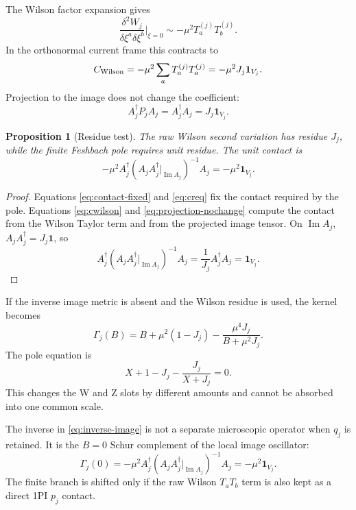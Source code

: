 \documentclass[11pt]{article}
\newcommand{\Imop}{\operatorname{Im}}
\theoremstyle{plain}
\newtheorem{proposition}{Proposition}[section]
\theoremstyle{definition}
\begin{document}
The Wilson factor expansion gives
\begin{equation}
  \frac{\delta^2W_j}{\delta\xi^a\delta\xi^b}\bigg|_{\xi=0}
  \sim -\mu^2T_a^{(j)}T_b^{(j)}.
  \label{eq:wilson2}
\end{equation}
In the orthonormal current frame this contracts to
\begin{equation}
  C_{\rm Wilson}
  =
  -\mu^2\sum_aT_a^{(j)}T_a^{(j)}
  =
  -\mu^2J_j\mathbf 1_{V_j}.
  \label{eq:cwilson}
\end{equation}
Projection to the image does not change the coefficient:
\begin{equation}
  A_j^\dagger P_jA_j
  =
  A_j^\dagger A_j
  =
  J_j\mathbf 1_{V_j}.
  \label{eq:projection-nochange}
\end{equation}

\begin{proposition}[Residue test]
The raw Wilson second variation has residue \(J_j\), while the finite
Feshbach pole requires unit residue.  The unit contact is
\begin{equation}
  -\mu^2A_j^\dagger
  \left(A_jA_j^\dagger|_{\Imop A_j}\right)^{-1}
  A_j
  =
  -\mu^2\mathbf 1_{V_j}.
  \label{eq:inverse-image}
\end{equation}
\end{proposition}

\begin{proof}
Equations \eqref{eq:contact-fixed} and \eqref{eq:creq} fix the contact required
by the pole.  Equations \eqref{eq:cwilson} and \eqref{eq:projection-nochange}
compute the contact from the Wilson Taylor term and from the projected image
tensor.  On \(\Imop A_j\),
\(A_jA_j^\dagger=J_j\mathbf 1\), so
\[
  A_j^\dagger
  \left(A_jA_j^\dagger|_{\Imop A_j}\right)^{-1}
  A_j
  =
  \frac{1}{J_j}A_j^\dagger A_j
  =
  \mathbf 1_{V_j}.
\]
\end{proof}

If the inverse image metric is absent and the Wilson residue is used, the
kernel becomes
\begin{equation}
  \Gamma_j(B)
  =
  B+\mu^2(1-J_j)
  -\frac{\mu^4J_j}{B+\mu^2J_j}.
  \label{eq:shifted}
\end{equation}
The pole equation is
\begin{equation}
  X+1-J_j-\frac{J_j}{X+J_j}=0.
  \label{eq:shifted-pole}
\end{equation}
This changes the W and Z slots by different amounts and cannot be absorbed
into one common scale.

The inverse in \eqref{eq:inverse-image} is not a separate microscopic operator
when \(q_j\) is retained.  It is the \(B=0\) Schur complement of the local
image oscillator:
\begin{equation}
  \Gamma_j(0)
  =
  -\mu^2A_j^\dagger
  \left(A_jA_j^\dagger|_{\Imop A_j}\right)^{-1}
  A_j
  =
  -\mu^2\mathbf 1_{V_j}.
  \label{eq:static-schur}
\end{equation}
The finite branch is shifted only if the raw Wilson \(T_aT_b\) term is also
kept as a direct 1PI \(p_j\) contact.
\end{document}
